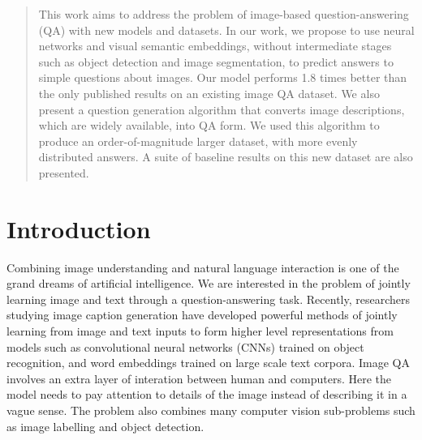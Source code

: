 \documentclass{article}
\renewcommand{\*}[1]{\textbf{#1}}
\begin{document}
 



\begin{abstract}
This work aims to address the problem of image-based question-answering (QA) 
with new models and datasets. In our work, we propose to use neural networks 
and visual semantic embeddings, without intermediate stages such as object 
detection and image segmentation, to predict answers to simple questions about 
images. Our model performs 1.8 times better than the only published results on 
an existing image QA dataset. We also present a question generation algorithm 
that converts image descriptions, which are widely available, into QA form. We 
used this algorithm to produce an order-of-magnitude larger dataset, with more 
evenly distributed answers. A suite of baseline results on this new dataset are 
also presented.
\end{abstract}

\section{Introduction}
Combining image understanding and natural language interaction is one of the 
grand dreams of artificial intelligence. We are interested in the problem of 
jointly learning image and text through a question-answering task. Recently, 
researchers studying image caption generation 
\cite{vinyals14,kiros14b,karpathy14,mao14,donahue14,chen14,fang14,xu15,
lebret15,klein15} have developed powerful methods of jointly learning from 
image and text inputs to form higher level representations from models such as 
convolutional neural networks (CNNs) trained on object recognition, and word 
embeddings trained on large scale text corpora. Image QA involves an extra 
layer of interation between human and computers. Here the model needs to pay 
attention to details of the image instead of describing it in a vague sense. 
The problem also combines many computer vision sub-problems such as image 
labelling and object detection. 
\end{document}
